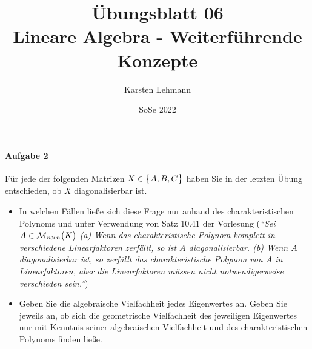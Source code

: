 \documentclass{scrreprt}
\author{Karsten Lehmann}
\date{SoSe 2022}
\title{Übungsblatt 06\\Lineare Algebra - Weiterführende Konzepte}
\begin{document}
\paragraph{Aufgabe 2} Für jede der folgenden Matrizen $X \in \qty\big{A, B, C}$
haben Sie in der letzten Übung entschieden, ob $X$ diagonalisierbar ist.
\begin{itemize}
\item In welchen Fällen ließe sich diese Frage nur anhand des charakteristischen
  Polynoms und unter Verwendung von Satz 10.41 der Vorlesung (\emph{``Sei
    $A \in \mathcal{M}_{n \times n}\qty\big(K)$ (a) Wenn
    das charakteristische Polynom komplett in verschiedene Linearfaktoren
    zerfällt, so ist $A$ diagonalisierbar.
    (b) Wenn $A$ diagonalisierbar ist, so zerfällt das charakteristische
    Polynom von $A$ in Linearfaktoren, aber die Linearfaktoren müssen nicht
    notwendigerweise verschieden sein.''})
\item Geben Sie die algebraische Vielfachheit jedes Eigenwertes an.
  Geben Sie jeweils an, ob sich die geometrische Vielfachheit des jeweiligen
  Eigenwertes nur mit Kenntnis seiner algebraischen Vielfachheit und des
  charakteristischen Polynoms finden ließe.
\end{itemize}
\end{document}
